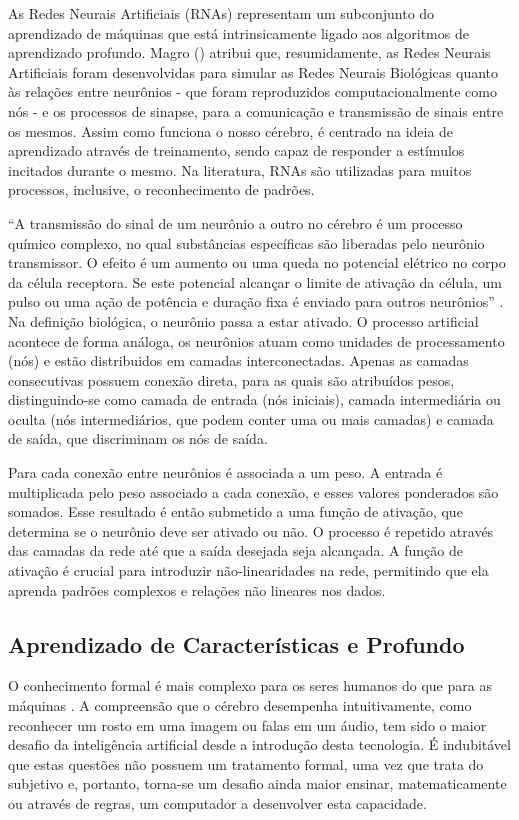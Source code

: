 As Redes Neurais Artificiais (RNAs) representam um subconjunto do aprendizado de máquinas que está intrinsicamente ligado aos algoritmos de aprendizado profundo. Magro (\citeyear{Magro21}) atribui que, resumidamente, as Redes Neurais Artificiais foram desenvolvidas para simular as Redes Neurais Biológicas quanto às relações entre neurônios - que foram reproduzidos computacionalmente como nós - e os processos de sinapse, para a comunicação e transmissão de sinais entre os mesmos. Assim como funciona o nosso cérebro, é centrado na ideia de aprendizado através de treinamento, sendo capaz de responder a estímulos incitados durante o mesmo. Na literatura, RNAs são utilizadas para muitos processos, inclusive, o reconhecimento de padrões.

``A transmissão do sinal de um neurônio a outro no cérebro é um processo químico complexo, no qual substâncias especíﬁcas são liberadas pelo neurônio transmissor. O efeito é um aumento ou uma queda no potencial elétrico no corpo da célula receptora. Se este potencial alcançar o limite de ativação da célula, um pulso ou uma ação de potência e duração ﬁxa é enviado para outros neurônios'' \cite{Barioni17}. Na definição biológica, o neurônio passa a estar ativado. O processo artificial acontece de forma análoga, os neurônios atuam como unidades de processamento (nós) e estão distribuidos em camadas interconectadas. Apenas as camadas consecutivas possuem conexão direta, para as quais são atribuídos pesos, distinguindo-se como camada de entrada (nós iniciais), camada intermediária ou oculta (nós intermediários, que podem conter uma ou mais camadas) e camada de saída, que discriminam os nós de saída.

Para cada conexão entre neurônios é associada a um peso. A entrada é multiplicada pelo peso associado a cada conexão, e esses valores ponderados são somados. Esse resultado é então submetido a uma função de ativação, que determina se o neurônio deve ser ativado ou não. O processo é repetido através das camadas da rede até que a saída desejada seja alcançada. A função de ativação é crucial para introduzir não-linearidades na rede, permitindo que ela aprenda padrões complexos e relações não lineares nos dados.

\subsection{Aprendizado de Características e Profundo}

O conhecimento formal é mais complexo para os seres humanos do que para as máquinas \cite{goodfellow16}. A compreensão que o cérebro desempenha intuitivamente, como reconhecer um rosto em uma imagem ou falas em um áudio, tem sido o maior desafio da inteligência artificial desde a introdução desta tecnologia. É indubitável que estas questões não possuem um tratamento formal, uma vez que trata do subjetivo e, portanto, torna-se um desafio ainda maior ensinar, matematicamente ou através de regras, um computador a desenvolver esta capacidade.


